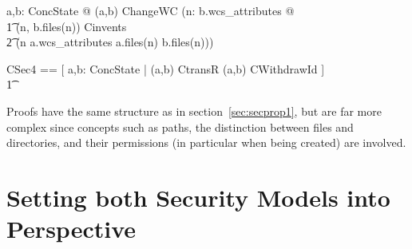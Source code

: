 \begin{enumerate}
\begin{axdef}
    \forall a,b: ConcState @ (a,b) \in ChangeWC \iff (\forall n: \dom
    b.wcs\_attributes @ \\
    \t1 (n, b.files(n)) \notin Cinvents \\
    \t2 \land (n \notin \dom a.wcs\_attributes \lor a.files(n) \neq
    b.files(n))) \\
  \end{axdef}
  \begin{zed}
    CSec4 == [ a,b: ConcState | (a,b) \in CtransR \land (a,b) \in
    CWithdrawId ] \\
    \t1  \\
  \end{zed}
\end{enumerate}

Proofs have the same structure as in section~\ref{sec:secprop1}, but are far
more complex since concepts such as paths, the distinction between files and
directories, and their permissions (in particular when being created) are
involved.





\section[Perspective]{Setting both Security Models into Perspective}
\label{sec:analysis}

\vspace{1ex}\noindent

